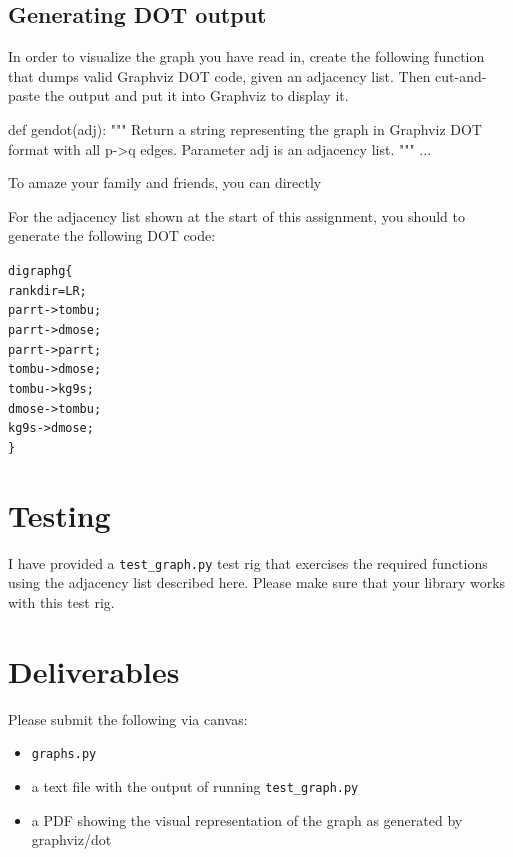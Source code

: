 \begin{fullwidth}
\subsection{Generating DOT output}

In order to visualize the graph you have read in, create the following function that dumps valid Graphviz DOT code, given an adjacency list. Then cut-and-paste the output and put it into Graphviz to display it.
 
\begin{pyverbatim}
def gendot(adj):
    """
    Return a string representing the graph in Graphviz DOT format
    with all p->q edges. Parameter adj is an adjacency list.
    """
    ...
\end{pyverbatim}

\noindent  To amaze your family and friends, you can directly

\noindent For the adjacency list shown at the start of this assignment, you should to generate the following DOT code:

\begin{alltt}\small
digraph g \{
  rankdir=LR;
  parrt -> tombu;
  parrt -> dmose;
  parrt -> parrt;
  tombu -> dmose;
  tombu -> kg9s;
  dmose -> tombu;
  kg9s -> dmose;
\}
\end{alltt}

\section{Testing}

I have provided a {\tt test\_graph.py} test rig that exercises the required functions using the adjacency list described here. Please make sure that your library works with this test rig.

\section{Deliverables}

Please submit the following via canvas:
 
\begin{itemize}
\item {\tt graphs.py}
\item a text file with the output of running {\tt test\_graph.py}
\item a PDF showing the visual representation of the graph as generated by graphviz/dot
\end{itemize}

\end{fullwidth}
